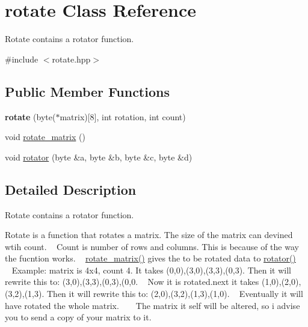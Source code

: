 \hypertarget{classrotate}{}\section{rotate Class Reference}
\label{classrotate}


Rotate contains a rotator function.  




{\ttfamily \#include $<$rotate.\+hpp$>$}

\subsection*{Public Member Functions}
\begin{DoxyCompactItemize}
\item 
{\bfseries rotate} (byte($\ast$matrix)\mbox{[}8\mbox{]}, int rotation, int count)\hypertarget{classrotate_ac9d9d20555e6d977364ec3dae0557f27}{}\label{classrotate_ac9d9d20555e6d977364ec3dae0557f27}

\item 
void \hyperlink{classrotate_a5512656d0755859c8c6c42e1e3a31275}{rotate\+\_\+matrix} ()
\item 
void \hyperlink{classrotate_a86248981f73105b3c5e968c17ee94e57}{rotator} (byte \&a, byte \&b, byte \&c, byte \&d)
\end{DoxyCompactItemize}


\subsection{Detailed Description}
Rotate contains a rotator function. 

Rotate is a function that rotates a matrix. The size of the matrix can devined wtih count. ~\newline
Count is number of rows and columns. This is because of the way the fucntion works. ~\newline
 \hyperlink{classrotate_a5512656d0755859c8c6c42e1e3a31275}{rotate\+\_\+matrix()} gives the to be rotated data to \hyperlink{classrotate_a86248981f73105b3c5e968c17ee94e57}{rotator()} ~\newline
 ~\newline
Example\+: matrix is 4x4, count 4. It takes (0,0),(3,0),(3,3),(0,3). Then it will rewrite this to\+: (3,0),(3,3),(0,3),(0,0. ~\newline
Now it is rotated.\+next it takes (1,0),(2,0),(3,2),(1,3). Then it will rewrite this to\+: (2,0),(3,2),(1,3),(1,0). ~\newline
Eventually it will have rotated the whole matrix. ~\newline
 ~\newline
The matrix it self will be altered, so i advise you to send a copy of your matrix to it. ~\newline
 

